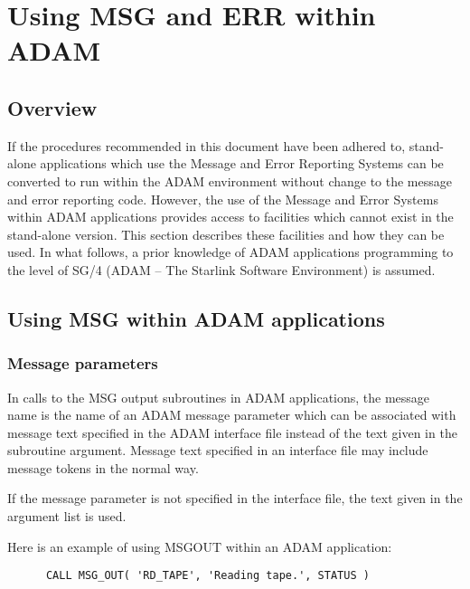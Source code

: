 \documentclass[twoside,11pt]{article}
\newcommand{\xref}[3]{#1}
\newcommand{\xlabel}[1]{}
\renewcommand{\_}{\texttt{\symbol{95}}}
\begin{document}
\newpage
\section{\xlabel{using_msg_and_err_within_adam}Using MSG and ERR within ADAM \label{adam_sect}}

\subsection{\xlabel{overview}Overview}

If the procedures recommended in this document have been adhered to, 
stand-alone applications which use the Message and Error Reporting Systems can
be converted to run within the ADAM environment without change to the message
and error reporting code.
However, the use of the Message and Error Systems within ADAM applications
provides access to facilities which cannot exist in the stand-alone version.
This section describes these facilities and how they can be used.
In what follows, a prior knowledge of ADAM applications programming to the
level of
\xref{SG/4}{sg4}{} (ADAM -- The Starlink Software Environment) is assumed.


\subsection{\xlabel{using_msg_within_adam_applications}Using MSG within ADAM applications \label{adam_msg}}

\subsubsection{\xlabel{message_parameters}Message parameters \label{mespar_sect}}
In calls to the MSG output subroutines in ADAM applications, the
message name is the name of an ADAM  message parameter which
can be associated with message text specified in the ADAM interface file 
instead of the text given in the subroutine argument.
Message text specified in an interface file may include message tokens in the
normal way.

If the message parameter is not specified in the interface file, 
the text given in the argument list is used.

Here is an example of using MSG\_OUT within an ADAM application:

\begin {small}
\begin{verbatim}
      CALL MSG_OUT( 'RD_TAPE', 'Reading tape.', STATUS )
\end{verbatim}
\end {small}
\end{document}
